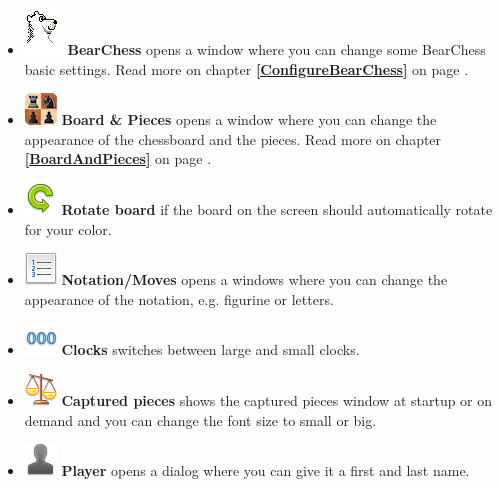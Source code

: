 \documentclass[11pt,a4paper]{article}
\begin{document}
\begin{itemize}
	\item  \includegraphics[scale=0.6]{BearChessIcon.png} \textbf{BearChess} opens a window where you can change some BearChess basic settings.  Read more on chapter \textbf{\ref{ConfigureBearChess}  } on page \pageref{ConfigureBearChess}.
	\item  \includegraphics[scale=0.9]{Board2DPieces32.png} \textbf{Board \& Pieces} opens a window where you can change the appearance of the chessboard and the pieces.  Read more on chapter \textbf{\ref{BoardAndPieces}  } on page \pageref{BoardAndPieces}.
	\item \includegraphics[scale=0.5]{arrow_rotate_anticlockwise.png}  \textbf{Rotate board} if the board on the screen should automatically rotate for your color.
	\item  \includegraphics[scale=0.5]{text_list_numbers.png} \textbf{Notation/Moves} opens a windows where you can change the appearance of the notation, e.g. figurine or letters.
	\item  \includegraphics[scale=0.5]{digit_separator.png}  \textbf{Clocks} switches between large and small clocks.
	\item  \includegraphics[scale=0.5]{balance_unbalance.png}  \textbf{Captured pieces} shows the captured pieces window at startup or on demand and you can change the font size to small or big.
	\item  \includegraphics[scale=0.5]{user_silhouette.png}  \textbf{Player} opens a dialog where you can give it a first and last name.	

\end{itemize}
\end{document}
